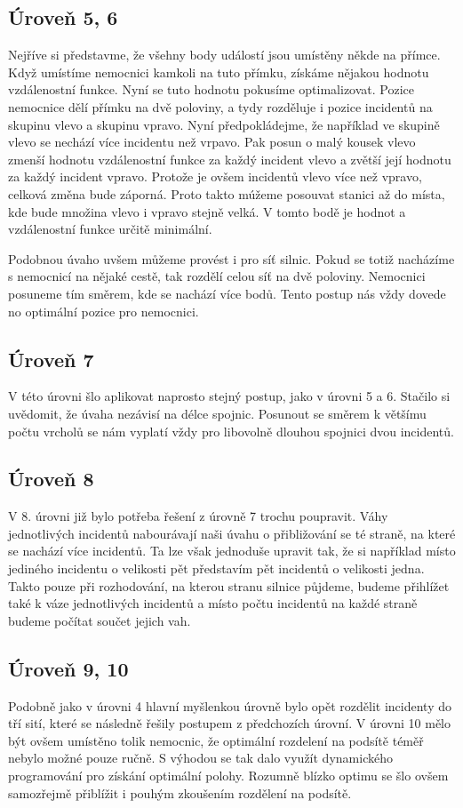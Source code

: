 \documentclass[12pt,a4paper]{article}
\begin{document}
\subsection*{Úroveň 5, 6}
Nejříve si představme, že všehny body událostí jsou umístěny někde na přímce. Když umístíme nemocnici kamkoli na tuto přímku, získáme nějakou hodnotu vzdálenostní funkce.
Nyní se tuto hodnotu pokusíme optimalizovat. Pozice nemocnice dělí přímku na dvě poloviny, a tydy rozděluje i pozice incidentů na skupinu vlevo a skupinu vpravo.
Nyní předpokládejme, že například ve skupině vlevo se nechází více incidentu než vrpavo. Pak posun o malý kousek vlevo zmenší hodnotu vzdálenostní funkce za každý incident vlevo a zvětší její hodnotu za každý incident vpravo.
Protože je ovšem incidentů vlevo více než vpravo, celková změna bude záporná. Proto takto múžeme posouvat stanici až do místa, kde bude množina vlevo i vpravo stejně velká.
V tomto bodě je hodnot a vzdálenostní funkce určitě minimální.

Podobnou úvaho uvšem můžeme provést i pro síť silnic. Pokud se totiž nacházíme s nemocnicí na nějaké cestě, tak rozdělí celou síť na dvě poloviny. Nemocnici posuneme tím směrem, kde se nachází více bodů.
Tento postup nás vždy dovede no optimální pozice pro nemocnici.

\subsection*{Úroveň 7}
V této úrovni šlo aplikovat naprosto stejný postup, jako v úrovni 5 a 6. Stačilo si uvědomit, že úvaha nezávisí na délce spojnic. Posunout se směrem k většímu počtu vrcholů se nám vyplatí vždy pro libovolně dlouhou spojnici dvou incidentů.

\subsection*{Úroveň 8}
V 8. úrovni již bylo potřeba řešení z úrovně 7 trochu poupravit. Váhy jednotlivých incidentů nabourávají naši úvahu o přibližování se té straně, na které se nachází více incidentů.
Ta lze však jednoduše upravit tak, že si například místo jediného incidentu o velikosti pět představím pět incidentů o velikosti jedna. Takto pouze při rozhodování, na kterou stranu silnice půjdeme, budeme přihlížet také k váze jednotlivých incidentů a místo počtu incidentů na každé straně budeme počítat součet jejich vah.

\subsection*{Úroveň 9, 10}
Podobně jako v úrovni 4 hlavní myšlenkou úrovně bylo opět rozdělit incidenty do tří sití, které se následně řešily postupem z předchozích úrovní. V úrovni 10 mělo být ovšem umístěno tolik nemocnic, že optimální rozdelení na podsítě téměř nebylo možné pouze ručně. S výhodou se tak dalo využít dynamického programování pro získání optimální polohy. Rozumně blízko optimu se šlo ovšem samozřejmě přiblížit i pouhým zkoušením rozdělení na podsítě.
\end{document}
